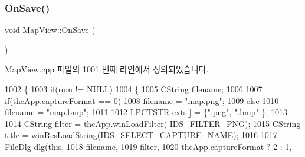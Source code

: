 \subsubsection{\texorpdfstring{On\+Save()}{OnSave()}}
{\footnotesize\ttfamily void Map\+View\+::\+On\+Save (\begin{DoxyParamCaption}{ }\end{DoxyParamCaption})\hspace{0.3cm}{\ttfamily [protected]}}



Map\+View.\+cpp 파일의 1001 번째 라인에서 정의되었습니다.


\begin{DoxyCode}
1002 \{
1003   \textcolor{keywordflow}{if}(\mbox{\hyperlink{_globals_8cpp_adafc6ed627110c42f3893c9783f55320}{rom}} != \mbox{\hyperlink{getopt1_8c_a070d2ce7b6bb7e5c05602aa8c308d0c4}{NULL}})
1004   \{
1005     CString \mbox{\hyperlink{_s_d_l_8cpp_ac33a174c39700095ca0f892624d85a3f}{filename}};
1006 
1007     \textcolor{keywordflow}{if}(\mbox{\hyperlink{_v_b_a_8cpp_a8095a9d06b37a7efe3723f3218ad8fb3}{theApp}}.\mbox{\hyperlink{class_v_b_a_a103f0b25433c57c4458a208a06799cf8}{captureFormat}} == 0)
1008       \mbox{\hyperlink{_s_d_l_8cpp_ac33a174c39700095ca0f892624d85a3f}{filename}} = \textcolor{stringliteral}{"map.png"};
1009     \textcolor{keywordflow}{else}
1010       \mbox{\hyperlink{_s_d_l_8cpp_ac33a174c39700095ca0f892624d85a3f}{filename}} = \textcolor{stringliteral}{"map.bmp"};
1011 
1012     LPCTSTR exts[] = \{\textcolor{stringliteral}{".png"}, \textcolor{stringliteral}{".bmp"} \};
1013 
1014     CString \mbox{\hyperlink{_s_d_l_8cpp_af0122ee4312107103b580a98c74a4ea6}{filter}} = \mbox{\hyperlink{_v_b_a_8cpp_a8095a9d06b37a7efe3723f3218ad8fb3}{theApp}}.\mbox{\hyperlink{class_v_b_a_a228edf26b0dc4129658c174ee5a3c27c}{winLoadFilter}}(
      \mbox{\hyperlink{resource_8h_a374944c3928d8197bc2bbf9e85207a4d}{IDS\_FILTER\_PNG}});
1015     CString title = \mbox{\hyperlink{_win_res_util_8cpp_a416e85e80ab9b01376e87251c83d1a5a}{winResLoadString}}(\mbox{\hyperlink{resource_8h_a10c24c77703afe57f6e641e939997cd2}{IDS\_SELECT\_CAPTURE\_NAME}});
1016 
1017     \mbox{\hyperlink{class_file_dlg}{FileDlg}} dlg(\textcolor{keyword}{this},
1018                 \mbox{\hyperlink{_s_d_l_8cpp_ac33a174c39700095ca0f892624d85a3f}{filename}},
1019                 \mbox{\hyperlink{_s_d_l_8cpp_af0122ee4312107103b580a98c74a4ea6}{filter}},
1020                 \mbox{\hyperlink{_v_b_a_8cpp_a8095a9d06b37a7efe3723f3218ad8fb3}{theApp}}.\mbox{\hyperlink{class_v_b_a_a103f0b25433c57c4458a208a06799cf8}{captureFormat}} ? 2 : 1,

\end{DoxyCode}
